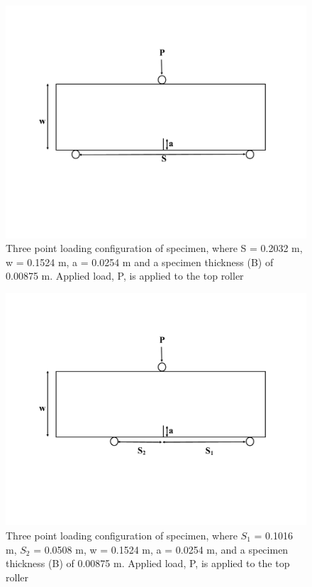 \documentclass[12pt]{article}
\begin{document}
\begin{figure}[H]
	\centering
	\includegraphics[width=1\textwidth]{Geometry.png}
	\caption{Three point loading configuration of specimen, where S = 0.2032 m, w = 0.1524 m, a = 0.0254 m and a specimen thickness (B) of 0.00875 m. Applied load, P, is applied to the top roller}
	\label{fig:Geometry}
\end{figure}

\begin{figure}[H]
	\centering
	\includegraphics[width=1\textwidth]{Geometry_Mixed.png}
	\caption{Three point loading configuration of specimen, where $S_{1}$ = 0.1016 m, $S_{2}$ = 0.0508 m, w = 0.1524 m, a = 0.0254 m, and a specimen thickness (B) of 0.00875 m. Applied load, P, is applied to the top roller}
	\label{fig:Geometry_Mixed}
\end{figure}	 
\end{document}
